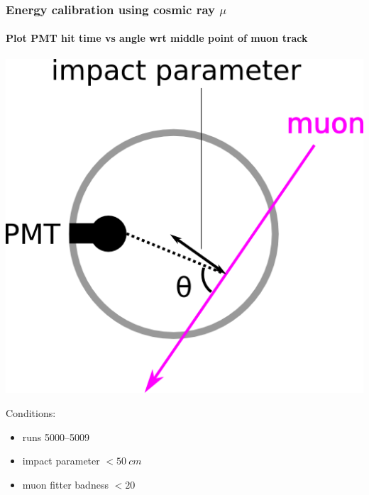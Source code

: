 \documentclass{beamer}
\begin{document}
\begin{frame}
	\frametitle{Energy calibration using cosmic ray $\mu$}
	\framesubtitle{Plot PMT hit time vs angle wrt middle point of muon track}
	\begin{center}
		\includegraphics[height=0.5\textheight]{pmt_angle_wrt_muon.png}
	\end{center}
	Conditions:
	\begin{itemize}
		\item runs \numrange{5000}{5009}
		\item impact parameter $< \SI{50}{cm}$
		\item muon fitter badness $< 20$
	\end{itemize}
\end{frame}
\end{document}
